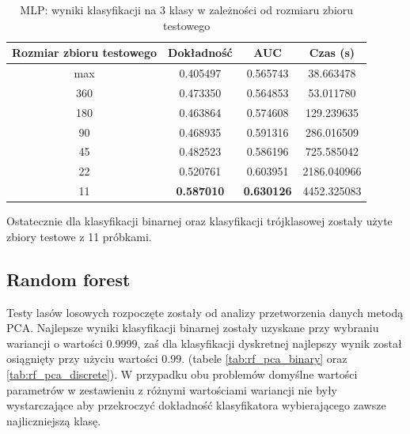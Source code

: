 \documentclass[a4paper, twoside, 11pt, openright]{article}
\begin{document}
\begin{table}[H]
    \centering
    \begin{tabular}{|c|c|c|c|}
    \hline
        \textbf{Rozmiar zbioru testowego} & \textbf{Dokładność} &  \textbf{AUC} &  \textbf{Czas (s)} \\ \hline
max                           &  0.405497 &  0.565743 &   38.663478 \\ \hline
360                         &  0.473350 &  0.564853 &   53.011780 \\ \hline
180                         &  0.463864 &  0.574608 &   129.239635 \\ \hline
90                        &  0.468935 &  0.591316 &   286.016509 \\ \hline
45                          &  0.482523 &  0.586196 &   725.585042 \\ \hline
22                         &  0.520761 &  0.603951 &  2186.040966 \\ \hline
11                          &  \textbf{0.587010} &  \textbf{0.630126} &  4452.325083 \\ \hline

    \end{tabular}
    \caption{MLP: wyniki klasyfikacji na 3 klasy w zależności od rozmiaru zbioru testowego}
    \label{tab:nn_walk_forward_test_discrete}
\end{table}

Ostatecznie dla klasyfikacji binarnej oraz klasyfikacji trójklasowej zostały użyte zbiory testowe z 11 próbkami.

\subsection{Random forest}

Testy lasów losowych rozpoczęte zostały od analizy przetworzenia danych metodą PCA. Najlepsze wyniki klasyfikacji binarnej zostały uzyskane przy wybraniu wariancji o wartości $0.9999$, zaś dla klasyfikacji dyskretnej najlepszy wynik został osiągnięty przy użyciu wartości $0.99$. (tabele \ref{tab:rf_pca_binary} oraz \ref{tab:rf_pca_discrete}). W przypadku obu problemów domyślne wartości parametrów w zestawieniu z różnymi wartościami wariancji nie były wystarczające aby przekroczyć dokładność klasyfikatora wybierającego zawsze najliczniejszą klasę.
\end{document}
